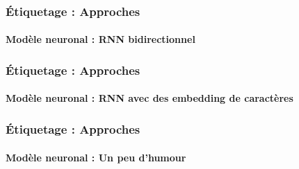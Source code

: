 \documentclass[xcolor=table]{beamer}
\begin{document}
\begin{frame}
\frametitle{Étiquetage : Approches}
\framesubtitle{Modèle neuronal : RNN bidirectionnel}


\end{frame}

\begin{frame}
\frametitle{Étiquetage : Approches}
\framesubtitle{Modèle neuronal : RNN avec des embedding de caractères}


\end{frame}

\begin{frame}
\frametitle{Étiquetage : Approches}
\framesubtitle{Modèle neuronal : Un peu d'humour}

\begin{center}
\end{center}

\end{frame}

\end{document}
